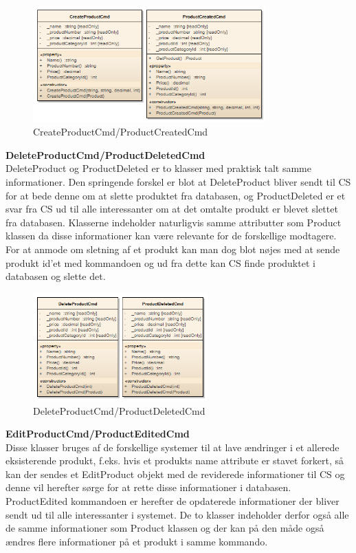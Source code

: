 \begin{figure}[H]
    \centering
    \includegraphics[width=0.8\textwidth]{Systemdesign/SharedLib/Images/Klasser/Command/Product/CreatePrd.png}
    \caption{CreateProductCmd/ProductCreatedCmd}
    \label{fig:klasseCMDCreatePrd}
\end{figure}

\textbf{DeleteProductCmd/ProductDeletedCmd}\\
DeleteProduct og ProductDeleted er to klasser med praktisk talt samme informationer. Den springende forskel er blot at DeleteProduct bliver sendt til \gls{CS} for at bede denne om at slette produktet fra databasen, og ProductDeleted er et svar fra \gls{CS} ud til alle interessanter om at det omtalte produkt er blevet slettet fra databasen.
Klasserne indeholder naturligvis samme attributter som Product klassen da disse informationer kan være relevante for de forskellige modtagere. For at anmode om sletning af et produkt kan man dog blot nøjes med at sende produkt id'et med kommandoen og ud fra dette kan \gls{CS} finde produktet i databasen og slette det.

\begin{figure}[H]
    \centering
    \includegraphics[width=0.6\textwidth]{Systemdesign/SharedLib/Images/Klasser/Command/Product/DeletePrd.png}
    \caption{DeleteProductCmd/ProductDeletedCmd}
    \label{fig:klasseCMDDeletePrd}
\end{figure}

\textbf{EditProductCmd/ProductEditedCmd}\\
Disse klasser bruges af de forskellige systemer til at lave ændringer i et allerede eksisterende produkt, f.eks. hvis et produkts name attribute er stavet forkert, så kan der sendes et EditProduct objekt med de reviderede informationer til \gls{CS} og denne vil herefter sørge for at rette disse informationer i databasen. ProductEdited kommandoen er herefter de opdaterede informationer der bliver sendt ud til alle interessanter i systemet. De to klasser indeholder derfor også alle de samme informationer som Product klassen og der kan på den måde også ændres flere informationer på et produkt i samme kommando.

